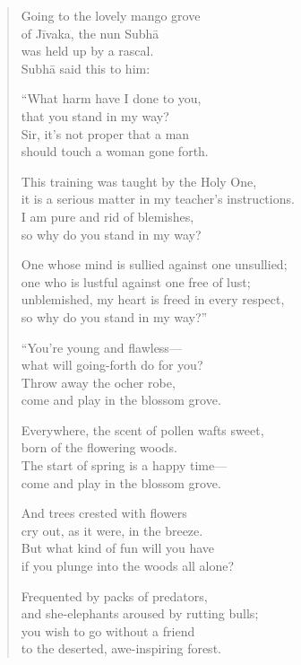 \documentclass[12pt,openany]{book}%
\begin{document}
\begin{verse}%
Going to the lovely mango grove \\
of \textsanskrit{Jīvaka}, the nun \textsanskrit{Subhā} \\
was held up by a rascal. \\
\textsanskrit{Subhā} said this to him: 

“What harm have I done to you, \\
that you stand in my way? \\
Sir, it’s not proper that a man \\
should touch a woman gone forth. 

This training was taught by the Holy One, \\
it is a serious matter in my teacher’s instructions. \\
I am pure and rid of blemishes, \\
so why do you stand in my way? 

One whose mind is sullied against one unsullied; \\
one who is lustful against one free of lust; \\
unblemished, my heart is freed in every respect, \\
so why do you stand in my way?” 

“You’re young and flawless—\\
what will going-forth do for you? \\
Throw away the ocher robe, \\
come and play in the blossom grove. 

Everywhere, the scent of pollen wafts sweet, \\
born of the flowering woods. \\
The start of spring is a happy time—\\
come and play in the blossom grove. 

And trees crested with flowers \\
cry out, as it were, in the breeze. \\
But what kind of fun will you have \\
if you plunge into the woods all alone? 

Frequented by packs of predators, \\
and she-elephants aroused by rutting bulls; \\
you wish to go without a friend \\
to the deserted, awe-inspiring forest. 


\end{verse}
\end{document}
